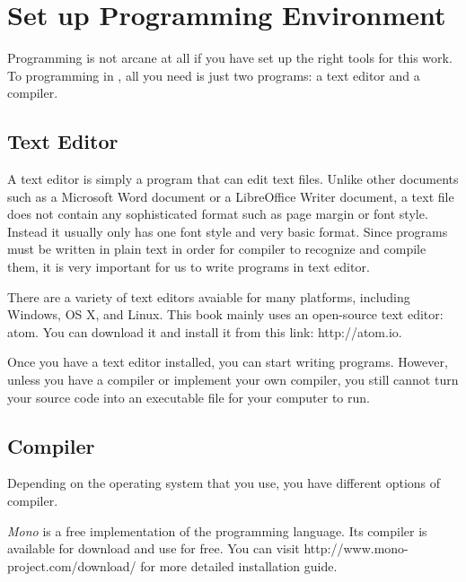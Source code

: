 \documentclass[../main.tex]{subfiles}
\begin{document}
    \chapter{Set up Programming Environment}
    Programming is not arcane at all if you have set up the right tools for
    this work. To programming in \csharp, all you need is just two programs: a
    text editor and a compiler.

    \section{Text Editor}
    A text editor is simply a program that can edit text files. Unlike other
    documents such as a Microsoft Word document or a LibreOffice Writer document,
    a text file does not contain any sophisticated format such as page margin
    or font style. Instead it usually only has one font style and very basic
    format. Since programs must be written in plain text in order for compiler
    to recognize and compile them, it is very important for us to write programs
    in text editor.

    There are a variety of text editors avaiable for many platforms, including
    Windows, OS X, and Linux. This book mainly uses an open-source text editor:
    atom. You can download it and install it from this link: http://atom.io.

    Once you have a text editor installed, you can start writing programs. However,
    unless you have a compiler or implement your own \csharp compiler, you still
    cannot turn your source code into an executable file for your computer to run.

    \section{\csharp Compiler}
    Depending on the operating system that you use, you have different options of
    \csharp compiler.

    \emph{Mono} is a free implementation of the \csharp programming language. Its
    compiler is available for download and use for free. You can visit
    http://www.mono-project.com/download/ for more detailed installation guide.
\end{document}
